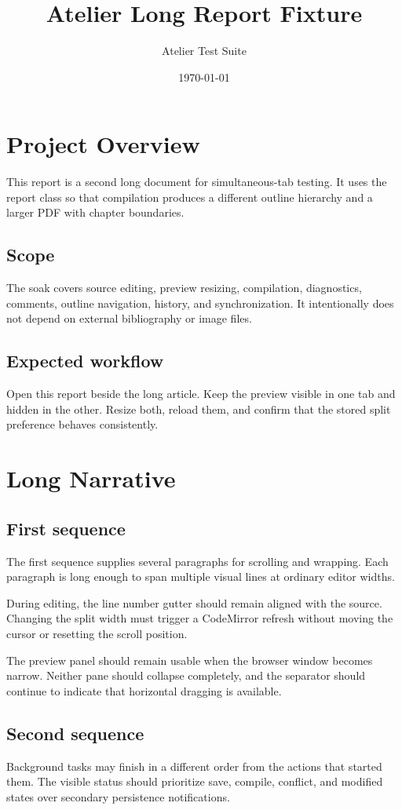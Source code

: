 \documentclass[12pt]{report}
\title{Atelier Long Report Fixture}
\author{Atelier Test Suite}
\date{\today}
\begin{document}
\maketitle
\tableofcontents

\chapter{Project Overview}
This report is a second long document for simultaneous-tab testing. It uses the
report class so that compilation produces a different outline hierarchy and a
larger PDF with chapter boundaries.

\section{Scope}
The soak covers source editing, preview resizing, compilation, diagnostics,
comments, outline navigation, history, and synchronization. It intentionally
does not depend on external bibliography or image files.

\section{Expected workflow}
Open this report beside the long article. Keep the preview visible in one tab
and hidden in the other. Resize both, reload them, and confirm that the stored
split preference behaves consistently.

\chapter{Long Narrative}
\section{First sequence}
The first sequence supplies several paragraphs for scrolling and wrapping. Each
paragraph is long enough to span multiple visual lines at ordinary editor widths.

During editing, the line number gutter should remain aligned with the source.
Changing the split width must trigger a CodeMirror refresh without moving the
cursor or resetting the scroll position.

The preview panel should remain usable when the browser window becomes narrow.
Neither pane should collapse completely, and the separator should continue to
indicate that horizontal dragging is available.

\section{Second sequence}
Background tasks may finish in a different order from the actions that started
them. The visible status should prioritize save, compile, conflict, and modified
states over secondary persistence notifications.
\end{document}

